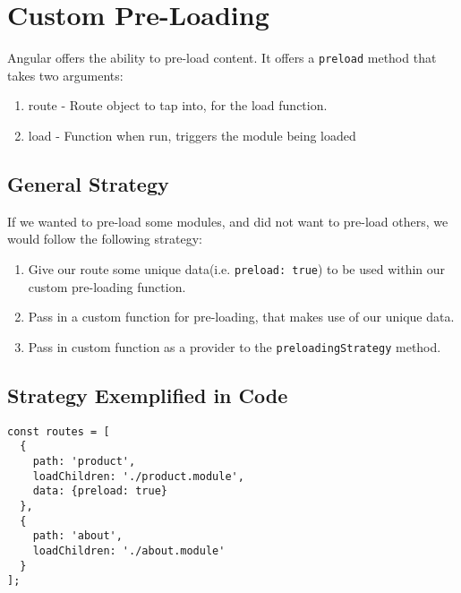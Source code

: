 \section{ Custom Pre-Loading }
Angular offers the ability to pre-load content. It offers a \lstinline{preload}
method that takes two arguments: 
\begin{enumerate}
  \item route - Route object to tap into, for the load function.
  \item load - Function when run, triggers the module being loaded
\end{enumerate}

\subsection{General Strategy}
If we wanted to pre-load some modules, and did not want to pre-load others, we
would follow the following strategy:
\begin{enumerate}
  \item Give our route some unique data(i.e. \lstinline{preload: true})
   to be used within our custom pre-loading function.
  \item Pass in a custom function for pre-loading, that makes use of our unique data. 
  \item Pass in custom function as a provider to the \lstinline{preloadingStrategy} 
  method.
\end{enumerate}

\subsection{Strategy Exemplified in Code}
\begin{lstlisting}
const routes = [
  {
    path: 'product',
    loadChildren: './product.module',
    data: {preload: true}
  },
  {
    path: 'about',
    loadChildren: './about.module'
  }
];
\end{lstlisting}
